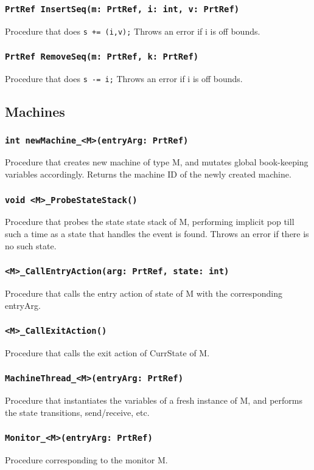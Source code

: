 \documentclass{llncs}
\begin{document}
\subsubsection{\texttt{PrtRef InsertSeq(m: PrtRef, i: int, v: PrtRef)}} 
Procedure that does \texttt{s += (i,v);} 
\newline 
Throws an error if i is off bounds.
\subsubsection{\texttt{PrtRef RemoveSeq(m: PrtRef, k: PrtRef)} }
Procedure that does \texttt{s -= i;}
\newline
Throws an error if i is off bounds.
\subsection {Machines} 
\subsubsection{\texttt{int newMachine\_<M>(entryArg: PrtRef)} }
Procedure that creates new machine of type M, and mutates global book-keeping variables accordingly. Returns the machine ID of the newly created machine.
\subsubsection{\texttt{void <M>\_ProbeStateStack()} }
Procedure that probes the state state stack of M, performing implicit pop till such a time as a state that handles the event is found. Throws an error if there is no such state.
\subsubsection{\texttt{<M>\_CallEntryAction(arg: PrtRef, state: int)} }
Procedure that calls the entry action of state of M with the corresponding entryArg.
\subsubsection{\texttt{<M>\_CallExitAction()} }
Procedure that calls the exit action of CurrState of M.
\subsubsection{\texttt{MachineThread\_<M>(entryArg: PrtRef)} }
Procedure that instantiates the variables of a fresh instance of M, and performs the state transitions, send/receive, etc.
\subsubsection{\texttt{Monitor\_<M>(entryArg: PrtRef)} }
Procedure corresponding to the monitor M.
\end{document}
